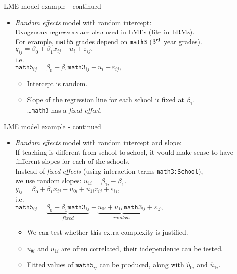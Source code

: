 \documentclass{beamer}
\begin{document}
\begin{frame}{LME model example - continued}
\begin{itemize}
\item \textit{Random effects} model with random intercept:\\
\bigskip
Exogenous regressors are also used in LMEs (like in LRMs).\\
\smallskip
For example, \texttt{math5} grades depend on \texttt{math3} ($3{^{\textnormal{rd}}}$ year grades).\\
\medskip
$ y_{ij} = \beta_{0} + \beta_1 x_{ij} + u_i + \varepsilon_{ij}, $\\
\medskip
i.e.\\
$ \texttt{math5}_{ij} = \beta_{0} + \beta_1 \texttt{math3}_{ij} + u_i + \varepsilon_{ij}, $\\
\medskip
\begin{itemize}
\item Intercept is random.
\smallskip
\item Slope of the regression line for each school is fixed at $\beta_1$.\\
\dots \texttt{math3} has a \textit{fixed effect}.
\end{itemize}
\end{itemize}
\end{frame}
\begin{frame}{LME model example - continued}
\begin{itemize}
\item \textit{Random effects} model with random intercept and slope:\\
\medskip
If teaching is different from school to school, it would make
sense to have different slopes for each of the schools.\\
\medskip
Instead of \textit{fixed effects} (using interaction terms \texttt{math3:School}), \\we use random slopes: $ u_{1i} = \beta_{1i} - \beta_1 $. \\
\medskip
$ y_{ij} = \beta_{0} + \beta_1 x_{ij} + u_{0i} + u_{1i} x_{ij}+ \varepsilon_{ij}, $ \\
\medskip
i.e.\\
\medskip
$\texttt{math5}_{ij} = \underbrace{\beta_{0} + \beta_1 \texttt{math3}_{ij}}_{\textit{fixed}}
+ \underbrace{u_{0i} + u_{1i}\, \texttt{math3}_{ij}}_{\textit{random}} 
+ \varepsilon_{ij}, $ \\
\medskip
\begin{itemize}
\item We can test whether this extra complexity is justified.
\smallskip
\item ${u}_{0i}$ and ${u}_{1i}$ are often correlated, their independence can be tested.
\smallskip
\item Fitted values of $\texttt{math5}_{ij}$ can be produced, along with $\hat{u}_{0i}$ and $\hat{u}_{1i}$.
\end{itemize}
\end{itemize}
\end{frame}
\end{document}
